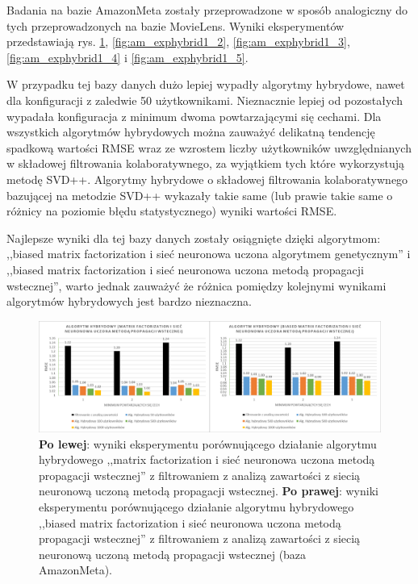\documentclass[twoside]{iisthesis}
\begin{document}
		Badania na bazie AmazonMeta zostały przeprowadzone w sposób analogiczny do tych przeprowadzonych na bazie MovieLens. Wyniki eksperymentów przedstawiają rys. \ref{fig:am_exphybrid1_1}, \ref{fig:am_exphybrid1_2}, \ref{fig:am_exphybrid1_3}, \ref{fig:am_exphybrid1_4} i  \ref{fig:am_exphybrid1_5}.
		
		W przypadku tej bazy danych dużo lepiej wypadły algorytmy hybrydowe, nawet dla konfiguracji z zaledwie 50 użytkownikami. Nieznacznie lepiej od pozostałych wypadała konfiguracja z minimum dwoma powtarzającymi się cechami. Dla wszystkich algorytmów hybrydowych można zauważyć delikatną tendencję spadkową wartości RMSE wraz ze wzrostem liczby użytkowników uwzględnianych w składowej filtrowania kolaboratywnego, za wyjątkiem tych które wykorzystują metodę SVD++. Algorytmy hybrydowe o składowej filtrowania kolaboratywnego bazującej na metodzie SVD++ wykazały takie same (lub prawie takie same o różnicy na poziomie błędu statystycznego) wyniki wartości RMSE.
		
		Najlepsze wyniki dla tej bazy danych zostały osiągnięte dzięki algorytmom: ,,biased matrix factorization i sieć neuronowa uczona algorytmem genetycznym'' i ,,biased matrix factorization i sieć neuronowa uczona metodą propagacji wstecznej'', warto jednak zauważyć że różnica pomiędzy kolejnymi wynikami algorytmów hybrydowych jest bardzo nieznaczna. 
		
		\begin{figure}
			\centering
			\includegraphics[width=1\textwidth]{am_exphybrid1_1}			
			\caption{\textbf{Po lewej}: wyniki eksperymentu porównującego działanie algorytmu hybrydowego ,,matrix factorization i sieć neuronowa uczona metodą propagacji wstecznej'' z filtrowaniem z analizą zawartości z siecią neuronową uczoną metodą propagacji wstecznej. \textbf{Po prawej}: wyniki eksperymentu porównującego działanie algorytmu hybrydowego ,,biased matrix factorization i sieć neuronowa uczona metodą propagacji wstecznej'' z filtrowaniem z analizą zawartości z siecią neuronową uczoną metodą propagacji wstecznej (baza AmazonMeta).}
			\label{fig:am_exphybrid1_1}
		\end{figure}
		
\end{document}
